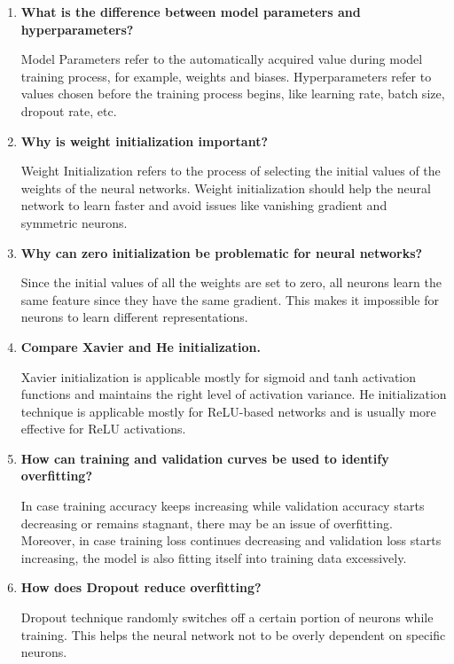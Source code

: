 \documentclass[10pt]{article}
\begin{document}
\begin{enumerate}

\item \textbf{What is the difference between model parameters and hyperparameters?}

Model Parameters refer to the automatically acquired value during model training process, for example, weights and biases. Hyperparameters refer to values chosen before the training process begins, like learning rate, batch size, dropout rate, etc.

\item \textbf{Why is weight initialization important?}

Weight Initialization refers to the process of selecting the initial values of the weights of the neural networks. Weight initialization should help the neural network to learn faster and avoid issues like vanishing gradient and symmetric neurons.

\item \textbf{Why can zero initialization be problematic for neural networks?}

Since the initial values of all the weights are set to zero, all neurons learn the same feature since they have the same gradient. This makes it impossible for neurons to learn different representations.

\item \textbf{Compare Xavier and He initialization.}

Xavier initialization is applicable mostly for sigmoid and tanh activation functions and maintains the right level of activation variance. He initialization technique is applicable mostly for ReLU-based networks and is usually more effective for ReLU activations.

\item \textbf{How can training and validation curves be used to identify overfitting?}

In case training accuracy keeps increasing while validation accuracy starts decreasing or remains stagnant, there may be an issue of overfitting. Moreover, in case training loss continues decreasing and validation loss starts increasing, the model is also fitting itself into training data excessively.

\item \textbf{How does Dropout reduce overfitting?}

Dropout technique randomly switches off a certain portion of neurons while training. This helps the neural network not to be overly dependent on specific neurons.


\end{enumerate}
\end{document}

